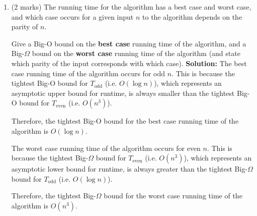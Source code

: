 \documentclass[a4,13pt]{extarticle}
\newenvironment{Solution}{\color{blue}\textbf{Solution:}}{}
\begin{document}
\begin{enumerate}
\begin{enumerate}
\begin{Solution}
Thus, as shown in class, $T_{\text{even}}\in O(n^3)$ by the first simplification rule of Big-O notation.

Now to obtain a tight Big-$\Omega$ bound, we claim that $T_{\text{even}}\in\Omega(n^3)$.

By definition, an arbitrary function $f(n)$ is $\Omega(g(n))$ if there exist positive constants $c$ and $n_0$ such that $f(n)\ge cg(n)$ for all $n\geq n_0$.

To show that $T_{\text{even}}(n)$ is $\Omega(n^3)$, let us suppose that $5n^3+\dfrac52n^2+\dfrac{15}2n+15\ge cn^3$, and attempt to find $c$ and $n_0$ values that uphold the proposed inequality.

Trivially, we may simply set $n_0=1$ and $c=1$ and we observe that $T_{\text{even}}(n)\in\Omega(n^3)$.
	      	\end{Solution}
	      	      	      	                  
	      	\item (2 marks) The running time for the algorithm has a best case and worst case, and which case occurs for a 
	      	      given input $n$ to the algorithm depends on the parity of $n$.
	      	      	      	                  
	      	      Give a Big-O bound on the \textbf{best case} running time of the algorithm, and a Big-$\Omega$ bound on 
	      	      the \textbf{worst case} running time of the algorithm (and state which parity of the input corresponds with which case).
	        \begin{Solution}
The best case running time of the algorithm occurs for odd $n$. This is because the tightest Big-O bound for $T_{\text{odd}}$ (i.e. $O(\log n)$), which represents an asymptotic upper bound for runtime, is always smaller than the tightest Big-O bound for $T_{\text{even}}$ (i.e. $O(n^3)$).

Therefore, the tightest Big-O bound for the best case running time of the algorithm is $O(\log n)$.

The worst case running time of the algorithm occurs for even $n$. This is because the tightest Big-$\Omega$ bound for $T_{\text{even}}$ (i.e. $O(n^3)$), which represents an asymptotic lower bound for runtime, is always greater than the tightest Big-$\Omega$ bound for $T_{\text{odd}}$ (i.e. $O(\log n)$).

Therefore, the tightest Big-$\Omega$ bound for the worst case running time of the algorithm is $O(n^3)$.
	      	\end{Solution}
	      	      	      	      

\end{enumerate}
\end{enumerate}
\end{document}
